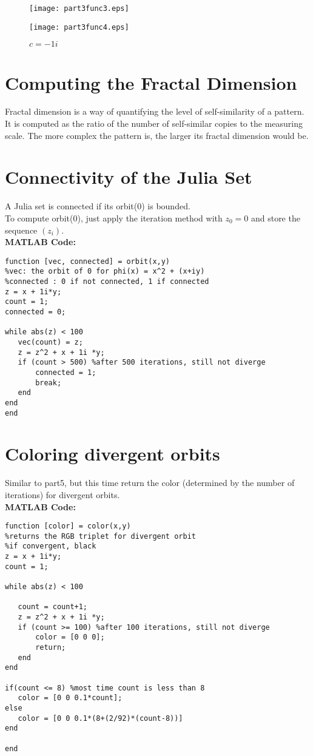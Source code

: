 \documentclass[11pt]{article}
\begin{document}
   \begin{figure}[H]
  \centering
  \begin{minipage}[b]{0.45\textwidth}
    \texttt{[image: part3func3.eps]}
    \caption{$c = -0.123 - 0.745i$}
  \end{minipage}
  \hfill
  \begin{minipage}[b]{0.45\textwidth}
    \texttt{[image: part3func4.eps]}
    \caption{$c = -1i$}
  \end{minipage}
   \end{figure}
   
\section{Computing the Fractal Dimension}
Fractal dimension is a way of quantifying the level of self-similarity of a pattern. It is computed as the ratio of the number of self-similar copies to the measuring scale. The more complex the pattern is, the larger its fractal dimension would be.

\section{Connectivity of the Julia Set}
A Julia set is connected if its orbit(0) is bounded. \\
To compute orbit(0), just apply the iteration method with $z_0 = 0$ and store the sequence $(z_i)$.\\
\textbf{MATLAB Code:}
\begin{lstlisting}
function [vec, connected] = orbit(x,y)
%vec: the orbit of 0 for phi(x) = x^2 + (x+iy)
%connected : 0 if not connected, 1 if connected
z = x + 1i*y;
count = 1;
connected = 0;

while abs(z) < 100
   vec(count) = z;
   z = z^2 + x + 1i *y;
   if (count > 500) %after 500 iterations, still not diverge
       connected = 1;
       break;
   end
end
end
\end{lstlisting}

\section{Coloring divergent orbits}
Similar to part5, but this time return the color (determined by the number of iterations) for divergent orbits.\\
\textbf{MATLAB Code:}\\
\begin{lstlisting}
function [color] = color(x,y)
%returns the RGB triplet for divergent orbit
%if convergent, black
z = x + 1i*y;
count = 1;

while abs(z) < 100

   count = count+1;
   z = z^2 + x + 1i *y;
   if (count >= 100) %after 100 iterations, still not diverge
       color = [0 0 0];
       return;
   end
end

if(count <= 8) %most time count is less than 8
   color = [0 0 0.1*count];
else 
   color = [0 0 0.1*(8+(2/92)*(count-8))]
end

end
\end{lstlisting}
\end{document}
